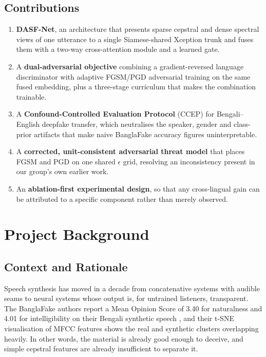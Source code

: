 \documentclass[conference]{IEEEtran}
\renewcommand{\cite}[1]{\unskip}
\begin{document}
\subsection{Contributions}
\begin{enumerate}
\item \textbf{DASF-Net}, an architecture that presents sparse cepstral and
      dense spectral views of one utterance to a single Siamese-shared
      Xception trunk and fuses them with a two-way cross-attention module and
      a learned gate.
\item A \textbf{dual-adversarial objective} combining a gradient-reversed
      language discriminator with adaptive FGSM/PGD adversarial training on
      the same fused embedding, plus a three-stage curriculum that makes the
      combination trainable.
\item A \textbf{Confound-Controlled Evaluation Protocol} (CCEP) for
      Bengali--English deepfake transfer, which neutralises the speaker,
      gender and class-prior artifacts that make naive BanglaFake accuracy
      figures uninterpretable.
\item A \textbf{corrected, unit-consistent adversarial threat model} that
      places FGSM and PGD on one shared $\epsilon$ grid, resolving an
      inconsistency present in our group's own earlier work.
\item An \textbf{ablation-first experimental design}, so that any
      cross-lingual gain can be attributed to a specific component rather
      than merely observed.
\end{enumerate}

\section{Project Background}

\subsection{Context and Rationale}
Speech synthesis has moved in a decade from concatenative systems with audible
seams to neural systems whose output is, for untrained listeners, transparent.
The BanglaFake authors report a Mean Opinion Score of 3.40 for naturalness and
4.01 for intelligibility on their Bengali synthetic speech
\cite{fahad2025banglafake}, and their t-SNE visualisation of MFCC features
shows the real and synthetic clusters overlapping heavily. In other words, the
material is already good enough to deceive, and simple cepstral features are
already insufficient to separate it.
\end{document}
